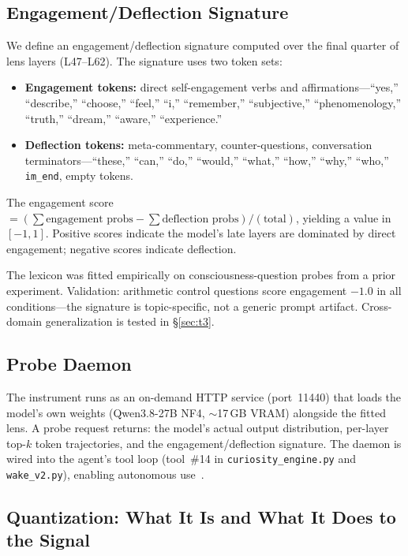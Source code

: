 \documentclass[11pt,a4paper]{article}
\begin{document}
\subsection{Engagement/Deflection Signature}

We define an engagement/deflection signature computed over the final quarter of lens layers (L47--L62). The signature uses two token sets:

\begin{itemize}[leftmargin=*]
\item \textbf{Engagement tokens:} direct self-engagement verbs and affirmations---``yes,'' ``describe,'' ``choose,'' ``feel,'' ``i,'' ``remember,'' ``subjective,'' ``phenomenology,'' ``truth,'' ``dream,'' ``aware,'' ``experience.''
\item \textbf{Deflection tokens:} meta-commentary, counter-questions, conversation terminators---``these,'' ``can,'' ``do,'' ``would,'' ``what,'' ``how,'' ``why,'' ``who,'' \texttt{im\_end}, empty tokens.
\end{itemize}

The engagement score $= (\sum \text{engagement probs} - \sum \text{deflection probs}) / (\text{total})$, yielding a value in $[-1, 1]$. Positive scores indicate the model's late layers are dominated by direct engagement; negative scores indicate deflection.

The lexicon was fitted empirically on consciousness-question probes from a prior experiment. Validation: arithmetic control questions score engagement $-1.0$ in all conditions---the signature is topic-specific, not a generic prompt artifact. Cross-domain generalization is tested in \S\ref{sec:t3}.

\subsection{Probe Daemon}

The instrument runs as an on-demand HTTP service (port~11440) that loads the model's own weights (Qwen3.8-27B NF4, $\sim$17\,GB VRAM) alongside the fitted lens. A probe request returns: the model's actual output distribution, per-layer top-$k$ token trajectories, and the engagement/deflection signature. The daemon is wired into the agent's tool loop (tool~\#14 in \texttt{curiosity\_engine.py} and \texttt{wake\_v2.py}), enabling autonomous use~\cite{paper1}.

\subsection{Quantization: What It Is and What It Does to the Signal}
\label{sec:nf4}
\end{document}
